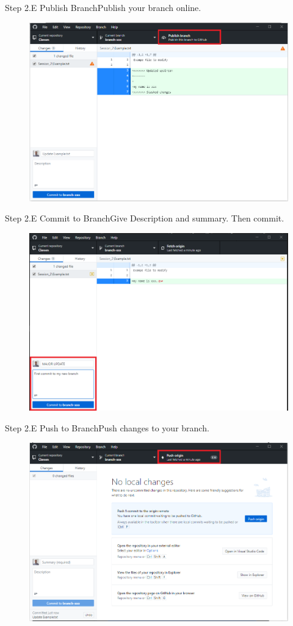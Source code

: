 \documentclass[aspectratio=169]{beamer}
\begin{document}
\begin{frame}{Step 2.E Publish Branch}{Publish your branch online.}
	\begin{figure}
		\centering
		\includegraphics[width=0.7\linewidth]{../images/step2.E}
	\end{figure}
\end{frame}

\begin{frame}{Step 2.E Commit to Branch}{Give Description and summary. Then commit.}
	\begin{figure}
		\centering
		\includegraphics[width=0.7\linewidth]{../images/step2.F}
	\end{figure}
\end{frame}


\begin{frame}{Step 2.E Push to Branch}{Push changes to your branch.}
	\begin{figure}
		\centering
		\includegraphics[width=0.7\linewidth]{../images/step2.G}
	\end{figure}
\end{frame}
\end{document}
